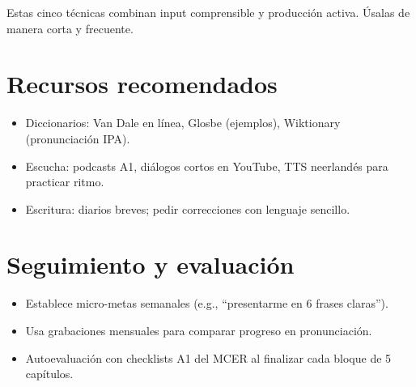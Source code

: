 Estas cinco técnicas combinan input comprensible y producción activa. Úsalas de manera corta y frecuente.







\section*{Recursos recomendados}
\begin{itemize}[leftmargin=*]
	\item Diccionarios: Van Dale en línea, Glosbe (ejemplos), Wiktionary (pronunciación IPA).
	\item Escucha: podcasts A1, diálogos cortos en YouTube, TTS neerlandés para practicar ritmo.
	\item Escritura: diarios breves; pedir correcciones con lenguaje sencillo.
\end{itemize}

\section*{Seguimiento y evaluación}
\begin{itemize}[leftmargin=*]
	\item Establece micro-metas semanales (e.g., ``presentarme en 6 frases claras'').
	\item Usa grabaciones mensuales para comparar progreso en pronunciación.
	\item Autoevaluación con checklists A1 del MCER al finalizar cada bloque de 5 capítulos.
\end{itemize}
